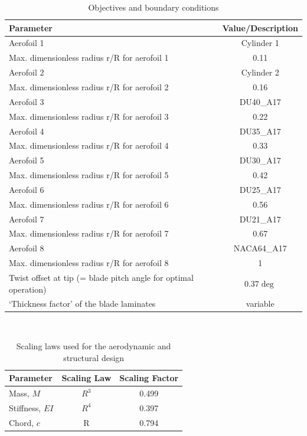 \begin{table}[H]
\begin{center} 
\caption{Objectives and boundary conditions}\label{tab:rotordesign2}
\begin{tabular}{ |l|c| } 
\hline
\textbf{Parameter} & \textbf{Value/Description}  \\ 
\hline
Aerofoil 1 & Cylinder 1  \\ 
\hline
Max. dimensionless radius r/R for aerofoil 1 & 0.11 \\ 
\hline
Aerofoil 2 & Cylinder 2 \\
\hline
Max. dimensionless radius r/R for aerofoil 2 & 0.16 \\ 
\hline
Aerofoil 3 & DU40_A17 \\
\hline
Max. dimensionless radius r/R for aerofoil 3 & 0.22 \\ 
\hline
Aerofoil 4 & DU35_A17  \\
\hline
Max. dimensionless radius r/R for aerofoil 4 & 0.33 \\ 
\hline
Aerofoil 5 & DU30_A17  \\
\hline
Max. dimensionless radius r/R for aerofoil 5 & 0.42 \\ 
\hline
Aerofoil 6 & DU25_A17  \\
\hline
Max. dimensionless radius r/R for aerofoil 6 & 0.56 \\ 
\hline
Aerofoil 7 & DU21_A17  \\
\hline
Max. dimensionless radius r/R for aerofoil 7 & 0.67 \\ 
\hline
Aerofoil 8 & NACA64_A17  \\
\hline
Max. dimensionless radius r/R for aerofoil 8 &  1\\ 
\hline
Twist offset at tip (= blade pitch angle for optimal operation) & $0.37 \deg$ \\
\hline
‘Thickness factor’ of the blade laminates & variable \\
\hline
\end{tabular} \\
\end{center}
\end{table}

\begin{table}[h]
\centering
\caption{Scaling laws used for the aerodynamic and structural design}
\label{tab:aero_struct_scaling}
\begin{tabular}{ |l|c|c| } 
\hline
\textbf{Parameter} & \textbf{Scaling Law} & \textbf{Scaling Factor}\\ 
\hline
Mass, $M$ & $R^3$ & 0.499 \\
\hline
Stiffness, $EI$ & $R^4$ & 0.397 \\
\hline
Chord, $c$ & R & 0.794\\
\hline
\end{tabular} \\
\end{table}

